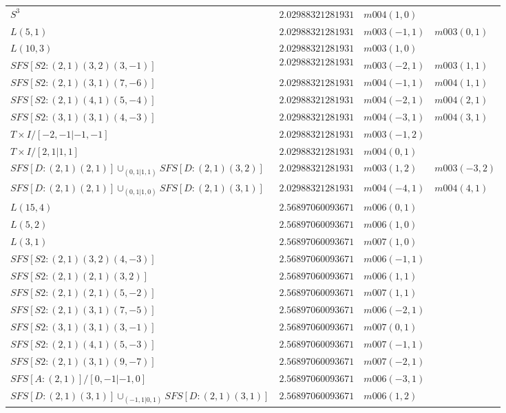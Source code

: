 \documentclass[a4paper]{gtart}
\theoremstyle{definition}
\theoremstyle{remark}
\numberwithin{equation}{section}
\begin{document}
\begin{center}
\begin{longtable}{llll}
		$S^3$ & $2.02988321281931$ & $m004(1, 0)$ & \\
		$L(5,1)$ & $2.02988321281931$ & $m003(-1, 1)$ & $m003(0, 1)$\\
		$L(10,3)$ & $2.02988321281931$ & $m003(1, 0)$ &  \\
		$SFS [S2: (2,1) (3,2) (3,-1)]$& $$2.02988321281931$$ & $m003(-2, 1)$ & $m003(1, 1)$   \\
		$SFS [S2: (2,1) (3,1) (7,-6)]$& $2.02988321281931$ & $m004(-1, 1)$ & $m004(1, 1)$    \\
		$SFS [S2: (2,1) (4,1) (5,-4)]$& $2.02988321281931$ & $m004(-2, 1)$ &  $m004(2, 1)$  \\
		$SFS [S2: (3,1) (3,1) (4,-3)]$& $2.02988321281931$ & $m004(-3, 1)$ & $m004(3, 1)$   \\
		$T \times I / [ -2,-1 | -1,-1 ]$ & $2.02988321281931$ & $m003(-1, 2)$ & \\
		$T \times I / [ 2,1 | 1,1 ]$ & $2.02988321281931$ & $m004(0, 1)$ &  \\
		$SFS [D: (2,1) (2,1)] \cup_{(0,1 | 1,1)} SFS [D: (2,1) (3,2)]$ & $2.02988321281931$ & $m003(1, 2)$ & $m003(-3, 2)$\\
		$SFS [D: (2,1) (2,1)] \cup_{( 0,1 | 1,0)} SFS [D: (2,1) (3,1)]$ & $2.02988321281931$ & $m004(-4, 1)$ & $m004(4, 1)$ \\
		\midrule
		$L(15,4)$ & $2.56897060093671$ & $m006(0, 1)$ & \\
		$L(5,2)$ & $2.56897060093671$ & $m006(1, 0)$ & \\
		$L(3,1)$ & $2.56897060093671$ & $m007(1, 0)$ & \\
		$SFS [S2: (2,1) (3,2) (4,-3)]$ & $2.56897060093671$ & $m006(-1, 1)$ &  \\
		$SFS [S2: (2,1) (2,1) (3,2)]$ & $2.56897060093671$ & $m006(1, 1)$ &  \\
		$SFS [S2: (2,1) (2,1) (5,-2)]$ & $2.56897060093671$ & $m007(1, 1)$ &  \\
		$SFS [S2: (2,1) (3,1) (7,-5)]$& $2.56897060093671$ & $m006(-2, 1)$ &    \\
		$SFS [S2: (3,1) (3,1) (3,-1)]$& $2.56897060093671$ & $m007(0, 1)$ &    \\
		$SFS [S2: (2,1) (4,1) (5,-3)]$& $2.56897060093671$ & $m007(-1, 1)$ &    \\
		$SFS [S2: (2,1) (3,1) (9,-7)]$& $2.56897060093671$ & $m007(-2, 1)$ &    \\
		$SFS [A: (2,1)] / [ 0,-1 | -1,0 ]$ & $2.56897060093671$ & $m006(-3, 1)$ & \\
		$SFS [D: (2,1) (3,1)] \cup_{(-1,1 | 0,1)} SFS [D: (2,1) (3,1)]$ & $2.56897060093671$ & $m006(1, 2)$ & \\

\end{longtable}
\end{center}
\end{document}
